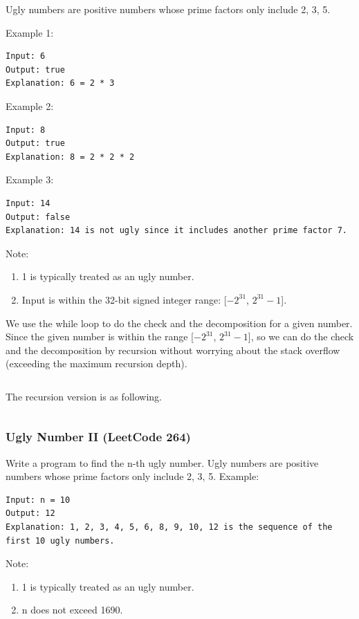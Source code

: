 \documentclass[11pt]{article}
\begin{document}
Ugly numbers are positive numbers whose prime factors only include 2, 3, 5.

Example 1:
\begin{verbatim}
Input: 6
Output: true
Explanation: 6 = 2 * 3
\end{verbatim}

Example 2:
\begin{verbatim}
Input: 8
Output: true
Explanation: 8 = 2 * 2 * 2
\end{verbatim}

Example 3:
\begin{verbatim}
Input: 14
Output: false 
Explanation: 14 is not ugly since it includes another prime factor 7.
\end{verbatim}

Note:
\begin{enumerate}
	\item 1 is typically treated as an ugly number.
	\item Input is within the 32-bit signed integer range: [$-2^{31}$, $2^{31}-1$].
\end{enumerate}

We use the while loop to do the check and the decomposition for a given number. Since the given number is within the range [$-2^{31}$, $2^{31}-1$], so we can do the check and the decomposition by recursion without worrying about the stack overflow (exceeding the maximum recursion depth). 
\inputminted[breaklines=true,frame=leftline, linenos=true]{python}{src/isUgly.py}

The recursion version is as following. 
\inputminted[breaklines=true,frame=leftline, linenos=true]{python}{src/isUgly_recursion.py}

\subsubsection{Ugly Number II (LeetCode 264)}
Write a program to find the n-th ugly number. 
Ugly numbers are positive numbers whose prime factors only include 2, 3, 5. 
Example:
\begin{verbatim}
Input: n = 10
Output: 12
Explanation: 1, 2, 3, 4, 5, 6, 8, 9, 10, 12 is the sequence of the first 10 ugly numbers.
\end{verbatim}
Note:  
\begin{enumerate}
\item 1 is typically treated as an ugly number.
\item n does not exceed 1690.
\end{enumerate}
\end{document}
